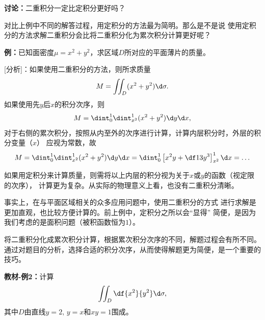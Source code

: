 \begin{shaded}

{\bf 讨论：}二重积分一定比定积分更好吗？

对比上例中不同的解答过程，用定积分的方法最为简明。那么是不是说
使用定积分的方法求解二重积分会比将二重积分化为累次积分计算更好呢？

{\bf 例：}已知面密度$\mu=x^2+y^2$，求区域$D$所对应的平面薄片的质量。

[分析]：如果使用二重积分的方法，则所求质量
$$M=\iint_D(x^2+y^2)\d\sigma.$$
如果使用先$y$后$x$的积分次序，则
$$M=\dint_0^1\dint_{x^2}^1(x^2+y^2)\d y\d x,$$
对于右侧的累次积分，按照从内至外的次序进行计算，计算内层积分时，外层的积分变量（$x$）
应视为常数，故
$$M=\dint_0^1\dint_{x^2}^1(x^2+y^2)\d y\d x
=\dint_0^1\left[x^2y+\df13y^3\right]_{x^2}^1\d x=\ldots$$

如果用定积分来计算质量，则需将以上内层的积分视为关于$x$或$y$的函数（视定限的次序），
计算更为复杂。从实际的物理意义上看，也没有二重积分清晰。

事实上，在与平面区域相关的众多应用问题中，使用二重积分的方式
进行求解是更加直观，也比较方便计算的。前上例中，定积分之所以会“显得”
简便，是因为我们考虑的是面积问题（被积函数恒为$1$）。

\end{shaded}
% 

% 

将二重积分化成累次积分计算，根据累次积分次序的不同，解题过程会有所不同。
通过对题目的分析，选择合适的积分次序，从而使得解题更为简便，是一个重要的技巧。

{\bf 教材-例2：}计算
$$\iint_D\df{x^2}{y^2}\d\sigma,$$
其中$D$由直线$y=2,\,y=x$和$xy=1$围成。

